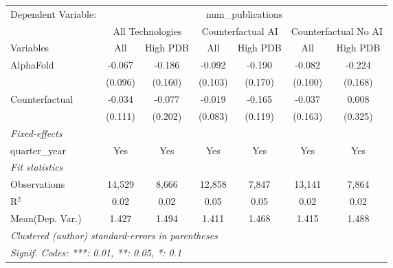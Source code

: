 \begingroup
\centering
\begin{tabular}{lcccccc}
   \tabularnewline \midrule \midrule
   Dependent Variable: & \multicolumn{6}{c}{num\_publications}\\
 & \multicolumn{2}{c}{All Technologies} & \multicolumn{2}{c}{Counterfactual AI} & \multicolumn{2}{c}{Counterfactual No AI} \\
\cmidrule(lr){1-1}\cmidrule(lr){2-3} \cmidrule(lr){4-5} \cmidrule(lr){6-7}
Variables & \multicolumn{1}{c}{All} & \multicolumn{1}{c}{High PDB} & \multicolumn{1}{c}{All} & \multicolumn{1}{c}{High PDB} & \multicolumn{1}{c}{All} & \multicolumn{1}{c}{High PDB} \\
\cmidrule(lr){1-1}\cmidrule(lr){2-2} \cmidrule(lr){3-3} \cmidrule(lr){4-4} \cmidrule(lr){5-5} \cmidrule(lr){6-6} \cmidrule(lr){7-7}
   AlphaFold      & -0.067  & -0.186  & -0.092  & -0.190  & -0.082  & -0.224\\   
                  & (0.096) & (0.160) & (0.103) & (0.170) & (0.100) & (0.168)\\   
   Counterfactual & -0.034  & -0.077  & -0.019  & -0.165  & -0.037  & 0.008\\   
                  & (0.111) & (0.202) & (0.083) & (0.119) & (0.163) & (0.325)\\   
   \midrule
   \emph{Fixed-effects}\\
   quarter\_year  & Yes     & Yes     & Yes     & Yes     & Yes     & Yes\\  
   \midrule
   \emph{Fit statistics}\\
   Observations   & 14,529  & 8,666   & 12,858  & 7,847   & 13,141  & 7,864\\  
   R$^2$          & 0.02    & 0.02    & 0.05    & 0.05    & 0.02    & 0.02\\  
Mean(Dep. Var.) & 1.427 & 1.494 & 1.411 & 1.468 & 1.415 & 1.488 \\
   \midrule \midrule
   \multicolumn{7}{l}{\emph{Clustered (author) standard-errors in parentheses}}\\
   \multicolumn{7}{l}{\emph{Signif. Codes: ***: 0.01, **: 0.05, *: 0.1}}\\
\end{tabular}
\par\endgroup
